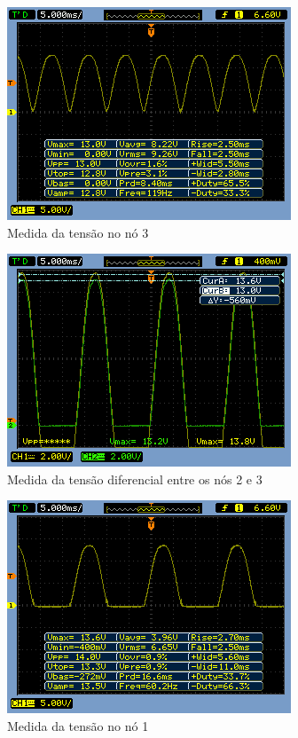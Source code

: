 \documentclass[a4paper]{article} %
\begin{document}
\newpage
\begin{figure}[h!]
\begin{centering}
\includegraphics[scale=0.7]{Imagens/3.3.1onda_completa/3} \caption{Medida da tensão no nó 3 \label{fig:q2-no3}}
\par\end{centering}
\end{figure}



\begin{figure}[h!]
\begin{centering}
\includegraphics[scale=0.7]{Imagens/3.3.1onda_completa/31} \caption{Medida da tensão diferencial entre os nós 2 e 3 \label{fig:Fig-45}}
\par\end{centering}
\end{figure}


\begin{figure}[h!]
\begin{centering}
\includegraphics[scale=0.7]{Imagens/3.3.1onda_completa/no1} \caption{Medida da tensão no nó 1 \label{fig:q2-no1}}
\par\end{centering}
\end{figure}
\end{document}
